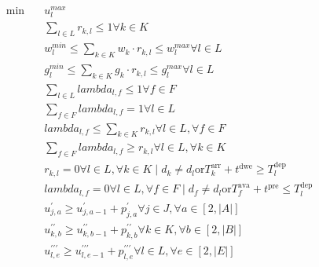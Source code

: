\begin{align}
  \min\quad & u_{l}^{max} \tag{eq\_0001} \\
  & \sum_{l \in L} r_{k , l} \leq 1 \forall k \in K \tag{eq\_0003} \\
  & w_{l}^{min} \leq \sum_{k \in K} w_{k} \cdot r_{k , l} \leq w_{l}^{max} \forall l \in L \tag{eq\_0004} \\
  & g_{l}^{min} \leq \sum_{k \in K} g_{k} \cdot r_{k , l} \leq g_{l}^{max} \forall l \in L \tag{eq\_0005} \\
  & \sum_{l \in L} \mathit{lambda}_{l , f} \leq 1 \forall f \in F \tag{eq\_0006} \\
  & \sum_{f \in F} \mathit{lambda}_{l , f} = 1 \forall l \in L \tag{eq\_0007} \\
  & \mathit{lambda}_{l , f} \leq \sum_{k \in K} r_{k , l} \forall l \in L , \forall f \in F \tag{eq\_0008} \\
  & \sum_{f \in F} \mathit{lambda}_{l , f} \geq r_{k , l} \forall l \in L , \forall k \in K \tag{eq\_0009} \\
  & r_{k , l} = 0 \forall l \in L , \forall k \in K \mid d_{k} \neq d_{l} \text{or} T_{k}^{\text{arr}} + t^{\text{dwe}} \geq T_{l}^{\text{dep}} \tag{eq\_0010} \\
  & \mathit{lambda}_{l , f} = 0 \forall l \in L , \forall f \in F \mid d_{f} \neq d_{l} \text{or} T_{f}^{\text{ava}} + t^{\text{pre}} \leq T_{l}^{\text{dep}} \tag{eq\_0011} \\
  & u_{j , a}^{'} \geq u_{j , a - 1}^{'} + p_{j , a}^{'} \forall j \in J , \forall a \in \left[2 , \left|A\right|\right] \tag{eq\_0014} \\
  & u_{k , b}^{' '} \geq u_{k , b - 1}^{' '} + p_{k , b}^{' '} \forall k \in K , \forall b \in \left[2 , \left|B\right|\right] \tag{eq\_0016} \\
  & u_{l , e}^{' ' '} \geq u_{l , e - 1}^{' ' '} + p_{l , e}^{' ' '} \forall l \in L , \forall e \in \left[2 , \left|E\right|\right] \tag{eq\_0017} \\

\end{align}
